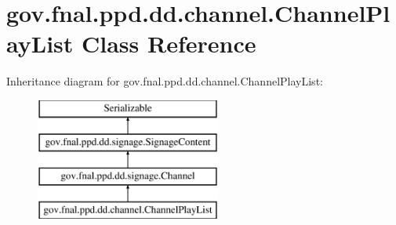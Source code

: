\hypertarget{classgov_1_1fnal_1_1ppd_1_1dd_1_1channel_1_1ChannelPlayList}{\section{gov.\-fnal.\-ppd.\-dd.\-channel.\-Channel\-Play\-List Class Reference}
\label{classgov_1_1fnal_1_1ppd_1_1dd_1_1channel_1_1ChannelPlayList}
}
Inheritance diagram for gov.\-fnal.\-ppd.\-dd.\-channel.\-Channel\-Play\-List\-:\begin{figure}[H]
\begin{center}
\leavevmode
\includegraphics[height=4.000000cm]{classgov_1_1fnal_1_1ppd_1_1dd_1_1channel_1_1ChannelPlayList}
\end{center}
\end{figure}
